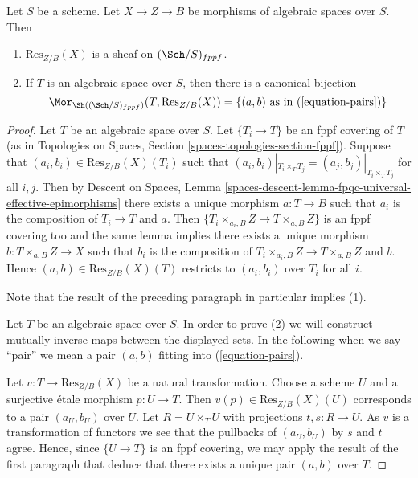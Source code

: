 \begin{lemma}
\label{lemma-restriction-of-scalars-sheaf}
Let $S$ be a scheme. Let $X \to Z \to B$ be morphisms of
algebraic spaces over $S$. Then
\begin{enumerate}
\item $\text{Res}_{Z/B}(X)$ is a sheaf on
$(\Sch/S)_{fppf}$.
\item If $T$ is an algebraic space over $S$, then there is a
canonical bijection
$$
\Mor_{\Sh((\Sch/S)_{fppf})}(T, \text{Res}_{Z/B}(X))
=
\{(a, b)\text{ as in }(\ref{equation-pairs})\}
$$
\end{enumerate}
\end{lemma}

\begin{proof}
Let $T$ be an algebraic space over $S$. Let $\{T_i \to T\}$ be an fppf
covering of $T$ (as in
Topologies on Spaces, Section \ref{spaces-topologies-section-fppf}).
Suppose that $(a_i, b_i) \in \text{Res}_{Z/B}(X)(T_i)$ such
that $(a_i, b_i)|_{T_i \times_T T_j} = (a_j, b_j)|_{T_i \times_T T_j}$
for all $i, j$. Then by
Descent on Spaces,
Lemma \ref{spaces-descent-lemma-fpqc-universal-effective-epimorphisms}
there exists a unique morphism $a : T \to B$ such that $a_i$ is the
composition of $T_i \to T$ and $a$. Then
$\{T_i \times_{a_i, B} Z \to T \times_{a, B} Z\}$ is an fppf covering
too and the same lemma implies there exists a unique morphism
$b : T \times_{a, B} Z \to X$ such that $b_i$ is the composition
of $T_i \times_{a_i, B} Z \to T \times_{a, B} Z$ and $b$. Hence
$(a, b) \in \text{Res}_{Z/B}(X)(T)$ restricts to $(a_i, b_i)$
over $T_i$ for all $i$.

\medskip\noindent
Note that the result of the preceding paragraph in particular implies (1).

\medskip\noindent
Let $T$ be an algebraic space over $S$. In order to prove (2) we will
construct mutually inverse maps between the displayed sets. In the
following when we say ``pair'' we mean a pair $(a, b)$ fitting
into (\ref{equation-pairs}).

\medskip\noindent
Let $v : T \to \text{Res}_{Z/B}(X)$ be a natural transformation.
Choose a scheme $U$ and a surjective \'etale morphism $p : U \to T$.
Then $v(p) \in \text{Res}_{Z/B}(X)(U)$ corresponds to a pair $(a_U, b_U)$
over $U$. Let $R = U \times_T U$ with projections $t, s : R \to U$.
As $v$ is a transformation of functors we see that the pullbacks of
$(a_U, b_U)$ by $s$ and $t$ agree. Hence, since $\{U \to T\}$ is an
fppf covering, we may apply the result of the first paragraph that
deduce that there exists a unique pair $(a, b)$ over $T$.


\end{proof}
